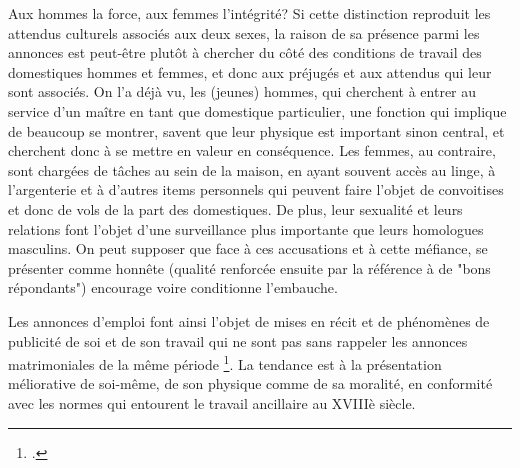 {Aux hommes la force, aux femmes l'intégrité? Si cette distinction reproduit les attendus culturels associés aux deux sexes, la raison de sa présence parmi les annonces est peut-être plutôt à chercher du côté des conditions de travail des domestiques hommes et femmes, et donc aux préjugés et aux attendus qui leur sont associés. On l'a déjà vu, les (jeunes) hommes, qui cherchent à entrer au service d'un maître en tant que domestique particulier, une fonction qui implique de beaucoup se montrer, savent que leur physique est important sinon central, et cherchent donc à se mettre en valeur en conséquence. Les femmes, au contraire, sont chargées de tâches au sein de la maison, en ayant souvent accès au linge, à l'argenterie et à d'autres items personnels qui peuvent faire l'objet de convoitises et donc de vols de la part des domestiques. De plus, leur sexualité et leurs relations font l'objet d'une surveillance plus importante que leurs homologues masculins. On peut supposer que face à ces accusations et à cette méfiance, se présenter comme honnête (qualité renforcée ensuite par la référence à de "bons répondants") encourage voire conditionne l'embauche.


\bigskip


Les annonces d'emploi font ainsi l'objet de mises en récit et de phénomènes de publicité de soi et de son travail qui ne sont pas sans rappeler les annonces matrimoniales de la même période \footcites{jonesPersonalsPoliticsCourting2001}. La tendance est à la présentation méliorative de soi-même, de son physique comme de sa moralité, en conformité avec les normes qui entourent le travail ancillaire au XVIIIè siècle. 

}
